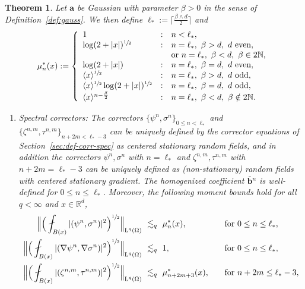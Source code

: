 \documentclass[JEP,XML,SOM,Unicode,published]{cedram}
\newenvironment{enumeratei}
{\bgroup\def\theenumi{\roman{enumi}}\def\theenumii{\arabic{enumii}}\begin{enumerate}}
{\end{enumerate}\egroup}
\theoremstyle{plain}
\newtheorem{theor0}{Theorem}[section]
\newenvironment{theor}
{\renewcommand{\qedsymbol}{$\lozenge$}\pushQED{\qed}\begin{theor0}}
{\popQED\end{theor0}}
\theoremstyle{definition}
\numberwithin{equation}{section}
\newcommand{\N}{\mathbb N}
\newcommand{\R}{\mathbb R}
\newcommand{\Aa}{\boldsymbol a}
\newcommand{\bb}{{\boldsymbol b}}
\newcommand{\Ld}{\operatorname{L}}
\begin{document}
\begin{theor}\label{th:corr-bounds}
Let $\Aa$ be Gaussian with parameter $\beta>0$ in the sense of Definition~\ref{def:gauss}.
We then define $\ell_*:=\lceil\tfrac{\beta\wedge d}2\rceil$ and\vspace*{-3pt}
\begin{equation}\label{eq:mun-*}
\mu_n^*(x):=\left\{\begin{array}{lll}
1&:&n<\ell_*,\\
\log(2+|x|)^{\sfrac12}&:&n=\ell_*,~\beta>d,~\text{$d$ even},\\
&&\text{or }n=\ell_*,~\beta<d,~\beta \in 2\N,\\
\log(2+|x|)&:&n=\ell_*,~\beta=d,~\text{$d$ even},\\
\langle x\rangle^{\sfrac12}&:&n=\ell_*,~\beta>d,~\text{$d$ odd},\\
\langle x\rangle^{\sfrac12}\log(2+|x|)^{\sfrac12}&:&n=\ell_*,~\beta = d,~\text{$d$ odd},\\
\langle x\rangle^{n-\frac\beta2}&:&n=\ell_*,~\beta<d,~\beta \notin 2\N.
\end{array}\right.
\end{equation}
\begin{enumeratei}
\item\emph{Spectral correctors:}
The correctors $\{\psi^n,\sigma^n\}_{0\le n< \ell_*}$ and $\{\zeta^{n,m},\tau^{n,m}\}_{n+2m<\ell_*-3}$ can be uniquely defined by the corrector equations of Section~\ref{sec:def-corr-spec} as centered stationary random fields, and in addition the correctors $\psi^n,\sigma^n$ with $n=\ell_*$ and $\zeta^{n,m},\tau^{n,m}$ with $n+2m=\ell_*-3$ can be uniquely defined as (non-stationary) random fields with centered stationary gradient.
The homogenized coefficient $\bar\bb{}^n$ is well-defined for $0\le n\le \ell_*$.
Moreover, the following moment bounds hold for all $q<\infty$ and $x\in\R^d$,\vspace*{-3pt}
\[\begin{aligned}
\Big\|\Big(\fint_{B(x)}|(\psi^n,\sigma^n)|^2\Big)^{\sfrac12}\Big\|_{\Ld^q(\Omega)}&~\lesssim_q~\mu_n^*(x),\quad&&\text{for $0\le n\le \ell_*$},\\
\Big\|\Big(\fint_{B(x)}|(\nabla\psi^n,\nabla\sigma^n)|^2\Big)^{\sfrac12}\Big\|_{\Ld^q(\Omega)}&~\lesssim_q~1,\quad&&\text{for $0\le n\le \ell_*$},\\
\Big\|\Big(\fint_{B(x)}|(\zeta^{n,m},\tau^{n,m})|^2\Big)^{\sfrac12}\Big\|_{\Ld^q(\Omega)}&~\lesssim_q~\mu^*_{n+2m+3}(x),\quad&&\text{for $n+2m\le \ell_*-3$},\\

\end{aligned}\]
\end{enumeratei}
\end{theor}
\end{document}
